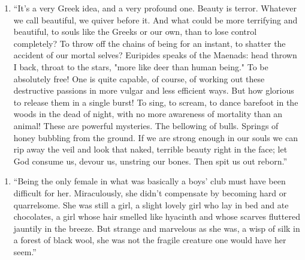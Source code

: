 \documentclass[11pt]{article}
\begin{document}
\begin{minipage}{\textwidth}
\begin{enumerate}[resume=main]
  \item “It's a very Greek idea, and a very profound one. Beauty is terror. Whatever we call beautiful, we quiver before it. And what could be more terrifying and beautiful, to souls like the Greeks or our own, than to lose control completely? To throw off the chains of being for an instant, to shatter the accident of our mortal selves? Euripides speaks of the Maenads: head thrown I back, throat to the stars, "more like deer than human being." To be absolutely free! One is quite capable, of course, of working out these destructive passions in more vulgar and less efficient ways. But how glorious to release them in a single burst! To sing, to scream, to dance barefoot in the woods in the dead of night, with no more awareness of mortality than an animal! These are powerful mysteries. The bellowing of bulls. Springs of honey bubbling from the ground. If we are strong enough in our souls we can rip away the veil and look that naked, terrible beauty right in the face; let God consume us, devour us, unstring our bones. Then spit us out reborn.” \\
\end{enumerate}
\end{minipage}

\begin{minipage}{\textwidth}
\begin{enumerate}[resume=main]
  \item “Being the only female in what was basically a boys’ club must have been difficult for her. Miraculously, she didn’t compensate by becoming hard or quarrelsome. She was still a girl, a slight lovely girl who lay in bed and ate chocolates, a girl whose hair smelled like hyacinth and whose scarves fluttered jauntily in the breeze. But strange and marvelous as she was, a wisp of silk in a forest of black wool, she was not the fragile creature one would have her seem.” \\
\end{enumerate}
\end{minipage}
\end{document}
